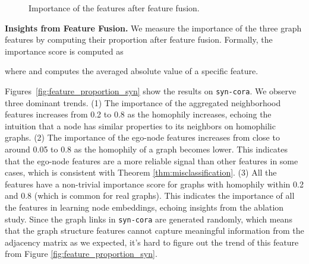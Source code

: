 \documentclass{article}
\theoremstyle{plain}
\begin{document}
\begin{figure}[!htb]
\centering
{}
\vspace{-10pt}
\caption{Importance of the features after feature fusion.}
\label{fig:feature_proportion}
\end{figure}

\textbf{Insights from Feature Fusion.} \label{sec:FusionAnalysis}
We measure the importance of the three graph features by computing their proportion after feature fusion. Formally, the importance score is computed as
 
where  and  computes the averaged absolute value of a specific feature.

Figures~\ref{fig:feature_proportion_syn} show the results on \texttt{syn-cora}. We observe three dominant trends.
(1) The importance of the aggregated neighborhood features increases from 0.2 to 0.8 as the homophily increases, echoing the intuition that a node has similar properties to its neighbors on homophilic graphs.
(2) The importance of the ego-node features increases from close to around 0.05 to 0.8 as the homophily of a graph becomes lower. This indicates that the ego-node features are a more reliable signal than other features in some cases, which is consistent with Theorem \ref{thm:misclassification}. 
(3) All the features have a non-trivial importance score for graphs with homophily within 0.2 and 0.8 (which is common for real graphs). This indicates the importance of all the features in learning node embeddings, echoing insights from the ablation study.
Since the graph links in \texttt{syn-cora} are generated randomly, which means that the graph structure features cannot capture meaningful information from the adjacency matrix as we expected, it's hard to figure out the trend of this feature from Figure \ref{fig:feature_proportion_syn}.
\end{document}
